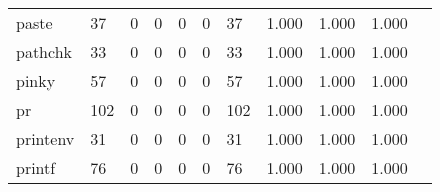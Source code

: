 \begin{longtable}{lp{1.2cm}p{1.2cm}p{1.2cm}p{1.2cm}p{1.2cm}p{1.2cm}p{1.2cm}p{1.2cm}p{1.2cm}p{1.2cm}}
paste     &                                    37 &                                                  0 &                                                  0 &                                                  0 &                                                  0 &                                                 37 &                                         1.000 &                                              1.000 &                                              1.000 \\
pathchk   &                                    33 &                                                  0 &                                                  0 &                                                  0 &                                                  0 &                                                 33 &                                         1.000 &                                              1.000 &                                              1.000 \\
pinky     &                                    57 &                                                  0 &                                                  0 &                                                  0 &                                                  0 &                                                 57 &                                         1.000 &                                              1.000 &                                              1.000 \\
pr        &                                   102 &                                                  0 &                                                  0 &                                                  0 &                                                  0 &                                                102 &                                         1.000 &                                              1.000 &                                              1.000 \\
printenv  &                                    31 &                                                  0 &                                                  0 &                                                  0 &                                                  0 &                                                 31 &                                         1.000 &                                              1.000 &                                              1.000 \\
printf    &                                    76 &                                                  0 &                                                  0 &                                                  0 &                                                  0 &                                                 76 &                                         1.000 &                                              1.000 &                                              1.000 \\

\end{longtable}

